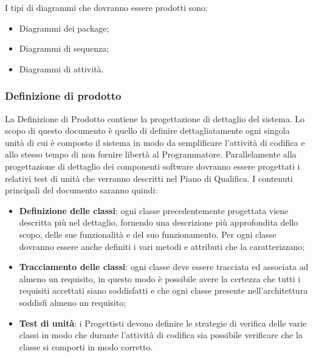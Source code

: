 \documentclass[../NormeDiProgetto.tex]{subfiles}
\begin{document}
                  I tipi di diagrammi che dovranno essere prodotti sono:
                  \begin{itemize}
                        \item Diagrammi dei package;
                        \item Diagrammi di sequenza;
                        \item Diagrammi di attività.
                  \end{itemize}

            \subsubsection{Definizione di prodotto}
                  La Definizione di Prodotto contiene la progettazione di dettaglio del sistema. Lo scopo di questo documento è quello di
                  definire dettagliatamente ogni singola unità di cui è composto il sistema in modo da semplificare
                  l’attività di codifica e allo stesso tempo di non fornire libertà al Programmatore.
                  Parallelamente alla progettazione di dettaglio dei componenti software dovranno essere progettati
                  i relativi test di unità che verranno descritti nel Piano di Qualifica.
                  I contenuti principali del documento saranno quindi:
                  \begin{itemize}
                        \item \textbf{Definizione delle classi}: ogni classe precedentemente progettata viene descritta più nel
                        dettaglio, fornendo una descrizione più approfondita dello scopo, delle sue funzionalità e del
                        suo funzionamento. Per ogni classe dovranno essere anche definiti i vari metodi e attributi
                        che la caratterizzano;
                        \item \textbf{Tracciamento delle classi}: ogni classe deve essere tracciata ed associata ad almeno un
                        requisito, in questo modo è possibile avere la certezza che tutti i requisiti accettati siano
                        soddisfatti e che ogni classe presente nell’architettura soddisfi almeno un requisito;
                        \item \textbf{Test di unità}: i Progettisti devono definire le strategie di verifica delle varie classi in modo
                        che durante l’attività di codifica sia possibile verificare che la classe si comporti in modo
                        corretto.
                  \end{itemize}
\end{document}

